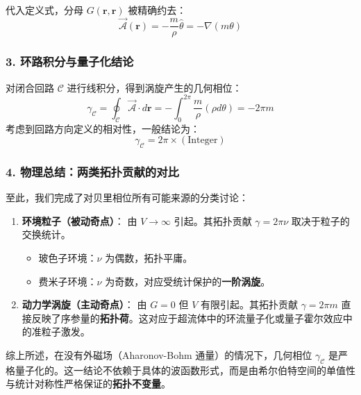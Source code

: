 \documentclass[a4paper,12pt]{article}
\begin{document}
代入定义式，分母 $G(\mathbf{r}, \mathbf{r})$ 被精确约去：
\begin{equation}
    \vec{\mathcal{A}}(\mathbf{r}) = -\frac{m}{\rho} \hat{\theta} = -\nabla(m\theta)
\end{equation}

\subsubsection{3. 环路积分与量子化结论}

对闭合回路 $\mathcal{C}$ 进行线积分，得到涡旋产生的几何相位：
\begin{equation}
    \gamma_{\mathcal{C}} = \oint_{\mathcal{C}} \vec{\mathcal{A}} \cdot d\mathbf{r} = -\int_{0}^{2\pi} \frac{m}{\rho} (\rho d\theta) = -2\pi m
\end{equation}
考虑到回路方向定义的相对性，一般结论为：
\begin{equation}
    \gamma_{\mathcal{C}} = 2\pi \times (\text{Integer})
\end{equation}

\subsubsection{4. 物理总结：两类拓扑贡献的对比}

至此，我们完成了对贝里相位所有可能来源的分类讨论：

\begin{enumerate}
    \item \textbf{环境粒子（被动奇点）}：
    由 $V \to \infty$ 引起。其拓扑贡献 $\gamma = 2\pi \nu$ 取决于粒子的交换统计。
    \begin{itemize}
        \item 玻色子环境：$\nu$ 为偶数，拓扑平庸。
        \item 费米子环境：$\nu$ 为奇数，对应受统计保护的\textbf{一阶涡旋}。
    \end{itemize}
    
    \item \textbf{动力学涡旋（主动奇点）}：
    由 $G=0$ 但 $V$ 有限引起。其拓扑贡献 $\gamma = 2\pi m$ 直接反映了序参量的\textbf{拓扑荷}。这对应于超流体中的环流量子化或量子霍尔效应中的准粒子激发。
\end{enumerate}

综上所述，在没有外磁场（Aharonov-Bohm 通量）的情况下，几何相位 $\gamma_{\mathcal{C}}$ 是严格量子化的。这一结论不依赖于具体的波函数形式，而是由希尔伯特空间的单值性与统计对称性严格保证的\textbf{拓扑不变量}。
\end{document}
